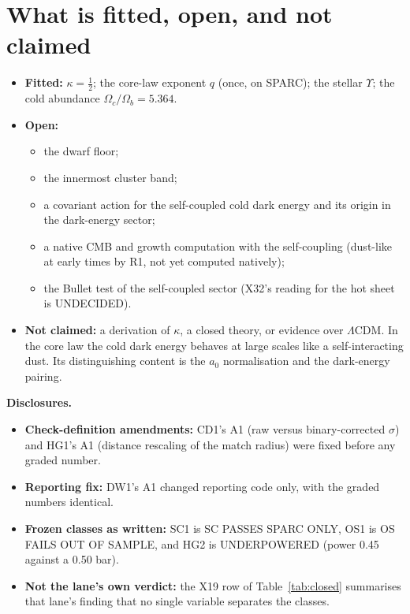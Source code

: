 \documentclass[10pt]{article}
\begin{document}
\section{What is fitted, open, and not claimed}
\begin{itemize}
\item \textbf{Fitted:} $\kappa=\tfrac12$; the core-law exponent $q$ (once, on SPARC); the stellar $\Upsilon$; the cold abundance $\Omega_c/\Omega_b=5.364$.
\item \textbf{Open:}
\begin{itemize}
\item the dwarf floor;
\item the innermost cluster band;
\item a covariant action for the self-coupled cold dark energy and its origin in the dark-energy sector;
\item a native CMB and growth computation with the self-coupling (dust-like at early times by R1, not yet computed natively);
\item the Bullet test of the self-coupled sector (X32's reading for the hot sheet is UNDECIDED).
\end{itemize}
\item \textbf{Not claimed:} a derivation of $\kappa$, a closed theory, or evidence over $\Lambda$CDM. In the core law the cold dark energy behaves at large scales like a self-interacting dust. Its distinguishing content is the $a_0$ normalisation and the dark-energy pairing.
\end{itemize}

\textbf{Disclosures.}
\begin{itemize}
\item \textbf{Check-definition amendments:} CD1's A1 (raw versus binary-corrected $\sigma$) and HG1's A1 (distance rescaling of the match radius) were fixed before any graded number.
\item \textbf{Reporting fix:} DW1's A1 changed reporting code only, with the graded numbers identical.
\item \textbf{Frozen classes as written:} SC1 is SC PASSES SPARC ONLY, OS1 is OS FAILS OUT OF SAMPLE, and HG2 is UNDERPOWERED (power 0.45 against a 0.50 bar).
\item \textbf{Not the lane's own verdict:} the X19 row of Table~\ref{tab:closed} summarises that lane's finding that no single variable separates the classes.
\end{itemize}
\end{document}
